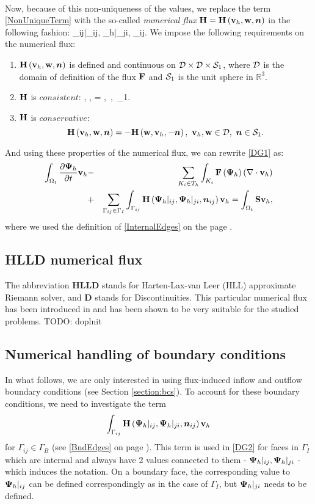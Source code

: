 \paragraph{}
Now, because of this non-uniqueness of the values, we replace the term \ref{NonUniqueTerm} with the so-called \textit{numerical flux} $\mathrm{\mathbf{H}} = \mathrm{\mathbf{H}}\left(\mathrm{\mathbf{v}}_h, \mathrm{\mathbf{w}}, \mbox{\boldmath $n$}\right)$ in the following fashion:
\be
\label{NumFluxDef}
\lo\mrF{}\ro \cdot \bfn_{ij}\ro \mrvh \approx \mrH{}|_{ij}, {\mrPsi_h}|_{ji}, \bfn_{ij}\ro \mrvh.
\ee
We impose the following requirements on the numerical flux:
\begin{enumerate}
 \item $\mathrm{\mathbf{H}}\left( \mathrm{\mathbf{v}}_h, \mathrm{\mathbf{w}}, \mbox{\boldmath $n$}\right)$ is defined and continuous on $\mathcal{D} \times \mathcal{D} \times \mathcal{S}_1$, where $\mathcal{D}$ is the domain of definition of the flux $\mathrm{\mathbf{F}}$ and $\mathcal{S}_1$ is the unit sphere in $\mathbb{R}^3$.
 \item $\mathrm{\mathbf{H}}$ is $consistent$:
\be
\label{FluxConsistent} \mrH\lo \mrvh, \mrvh, \bfn\ro = \mrF\lo \mrvh\ro \bfn,\ \mrvh\in{},\ \bfn\in{}_1.
 \ee
 \item $\mathrm{\mathbf{H}}$ is $conservative$:
 $$
 \mrH\lo \mrvh, \mrw, \bfn\ro = -\mrH\lo \mrw, \mrvh, -\bfn\ro,\ \mrvh, \mrw\in\mc{D},\ \bfn\in\mc{S}_1.
 $$
 \end{enumerate}
And using these properties of the numerical flux, we can rewrite \ref{DG1} as:
\begin{eqnarray}
\label{DG2} \int_{\Omega_{t}} \frac{\partial{{\mathrm{\mathbf{\Psi}}_h}}}{\partial{t}} \mathrm{\mathbf{v}}_h & - & \sum_{K_i \in T_h}\int_{K_i}\mathrm{\mathbf{F}}\left({\mathrm{\mathbf{\Psi}}_h}\right) \left(\nabla \cdot \mathrm{\mathbf{v}}_h\right)\\ \nonumber & + & \sum_{\Gamma_{ij}\in\Gamma_I} \int_{\Gamma_{ij}} \mathrm{\mathbf{H}}\left({\mathrm{\mathbf{\Psi}}_h}|_{ij}, {\mathrm{\mathbf{\Psi}}_h}|_{ji}, \mbox{\boldmath $n$}_{ij}\right) \mathrm{\mathbf{v}}_h = \int_{\Omega_{t}} \mathrm{\mathbf{S}} \mathrm{\mathbf{v}}_h,
\end{eqnarray}
where we used the definition of \ref{InternalEdges} on the page \pageref{InternalEdges}.
\subsection{HLLD numerical flux}
The abbreviation \textbf{HLLD} stands for Harten-Lax-van Leer (HLL) approximate Riemann solver, and \textbf{D} stands for Discontinuities.
This particular numerical flux has been introduced in \citep{hlld} and has been shown to be very suitable for the studied problems.
TODO: doplnit
\subsection{Numerical handling of boundary conditions}
In what follows, we are only interested in using flux-induced inflow and outflow boundary conditions (see Section \ref{section:bcs}).
To account for these boundary conditions, we need to investigate the term
$$
\int_{\Gamma_{ij}} \mathrm{\mathbf{H}}\left({\mathrm{\mathbf{\Psi}}_h}|_{ij}, {\mathrm{\mathbf{\Psi}}_h}|_{ji}, \mbox{\boldmath $n$}_{ij}\right) \mathrm{\mathbf{v}}_h
$$
for $\Gamma_{ij} \in \Gamma_B$ (see \ref{BndEdges} on page \pageref{BndEdges}).
This term is used in \ref{DG2} for faces in $\Gamma_I$ which are internal and always have 2 values connected to them - $\mathrm{\mathbf{\Psi}}_h|_{ij}, {\mathrm{\mathbf{\Psi}}_h}|_{ji}$ - which induces the notation. On a boundary face, the corresponding value to ${\mathrm{\mathbf{\Psi}}_h}|_{ij}$ can be defined correspondingly as in the case of $\Gamma_I$, but ${\mathrm{\mathbf{\Psi}}_h}|_{ji}$ needs to be defined.

